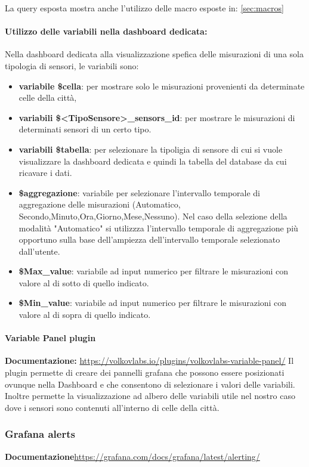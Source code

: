 La query esposta mostra anche l'utilizzo delle macro esposte in: \ref{sec:macros}
\paragraph*{Utilizzo delle variabili nella dashboard dedicata:}
Nella dashboard dedicata alla visualizzazione spefica delle misurazioni di una sola tipologia di sensori, le variabili sono:
\begin{itemize}
    \item \textbf{variabile \$cella}: per mostrare solo le misurazioni provenienti da determinate celle della città, 
    \item \textbf{variabili \$<TipoSensore>\_sensors\_id}: per mostrare le misurazioni di determinati sensori di un certo tipo.
    \item \textbf{variabili \$tabella}: per selezionare la tipoligia di sensore di cui si vuole visualizzare la dashboard dedicata e quindi la tabella del database da cui ricavare i dati.
    \item \textbf{\$aggregazione}: variabile per selezionare l'intervallo temporale di aggregazione delle misurazioni
    (Automatico, Secondo,Minuto,Ora,Giorno,Mese,Nessuno).
    Nel caso della selezione della modalità "Automatico" si utilizzza l'intervallo temporale di aggregazione più opportuno sulla base dell'ampiezza dell'intervallo temporale selezionato dall'utente.
    \item \textbf{\$Max\_value}: variabile ad input numerico per filtrare le misurazioni con valore al di sotto di quello indicato.
    \item \textbf{\$Min\_value}: variabile ad input numerico per filtrare le misurazioni con valore al di sopra di quello indicato.
\end{itemize}
\paragraph{Variable Panel plugin}
\textbf{Documentazione:} \href{https://volkovlabs.io/plugins/volkovlabs-variable-panel/}{https://volkovlabs.io/plugins/volkovlabs-variable-panel/}
Il plugin permette di creare dei pannelli grafana che possono essere posizionati ovunque nella Dashboard e che consentono di selezionare i valori delle variabili.
Inoltre permette la visualizzazione ad albero delle variabili utile nel nostro caso dove i sensori sono contenuti all'interno di celle della città.

\subsubsection{Grafana alerts}
\textbf{Documentazione}\href{https://grafana.com/docs/grafana/latest/alerting/}{https://grafana.com/docs/grafana/latest/alerting/}


